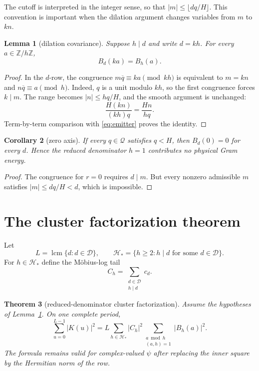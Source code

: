 \documentclass[11pt]{article}
\newtheorem{theorem}{Theorem}[section]
\newtheorem{lemma}[theorem]{Lemma}
\newtheorem{corollary}[theorem]{Corollary}
\theoremstyle{definition}
\theoremstyle{remark}
\newcommand{\ZZ}{\mathbb Z}
\newcommand{\Dd}{\mathcal D}
\newcommand{\QQ}{\mathcal Q}
\begin{document}
The cutoff is interpreted in the integer sense, so that
$|m|\le\lfloor dq/H\rfloor$.  This convention is important when the dilation
argument changes variables from $m$ to $kn$.

\begin{lemma}[dilation covariance]
\label{lem:dilation}
Suppose $h\mid d$ and write $d=kh$.  For every $a\in\ZZ/h\ZZ$,
\begin{equation}
 B_d(ka)=B_h(a).
 \label{eq:dilation}
\end{equation}
\end{lemma}

\begin{proof}
In the $d$-row, the congruence
$m\overline q\equiv ka\pmod{kh}$ is equivalent to
$m=kn$ and $n\overline q\equiv a\pmod h$.  Indeed, $q$ is a unit modulo
$kh$, so the first congruence forces $k\mid m$.  The range becomes
$|n|\le hq/H$, and the smooth argument is unchanged:
\[
 \frac{H(kn)}{(kh)q}=\frac{Hn}{hq}.
\]
Term-by-term comparison with \eqref{eq:emitter} proves the identity.
\end{proof}

\begin{corollary}[zero axis]
\label{cor:zero}
If every $q\in\QQ$ satisfies $q<H$, then $B_d(0)=0$ for every $d$.  Hence the
reduced denominator $h=1$ contributes no physical Gram energy.
\end{corollary}

\begin{proof}
The congruence for $r=0$ requires $d\mid m$.  But every nonzero admissible
$m$ satisfies $|m|\le dq/H<d$, which is impossible.
\end{proof}

\section{The cluster factorization theorem}

Let
\begin{equation}
 L=\operatorname{lcm}\{d:d\in\Dd\},
 \qquad
 \mathcal H_* =\{h\ge 2:h\mid d\text{ for some }d\in\Dd\}.
 \label{eq:period}
\end{equation}
For $h\in\mathcal H_*$ define the M\"obius-log tail
\begin{equation}
 C_h=\sum_{\substack{d\in\Dd\\h\mid d}}c_d.
 \label{eq:tail}
\end{equation}

\begin{theorem}[reduced-denominator cluster factorization]
\label{thm:cluster}
Assume the hypotheses of Lemma~\ref{lem:dilation}.  On one complete period,
\begin{equation}
 \sum_{u=0}^{L-1}|K(u)|^2
 =L\sum_{h\in\mathcal H_*}|C_h|^2
   \sum_{\substack{a\bmod h\\(a,h)=1}}|B_h(a)|^2.
 \label{eq:cluster}
\end{equation}
The formula remains valid for complex-valued $\psi$ after replacing the inner
square by the Hermitian norm of the row.
\end{theorem}
\end{document}
